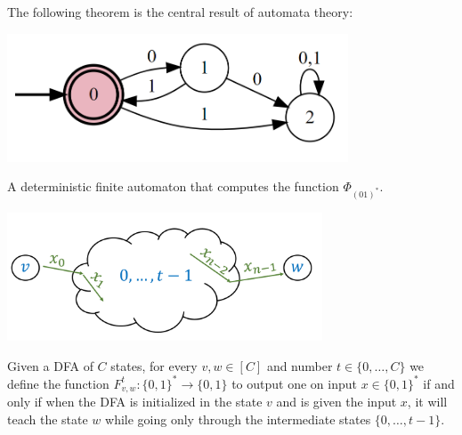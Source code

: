 The following theorem is the central result of automata theory:

\hypertarget{dfaregequivthm}{}



\begin{marginfigure}
\centering
\includegraphics[width=\linewidth, height=1.5in, keepaspectratio]{../figure/automaton.png}
\caption{A deterministic finite automaton that computes the function
\(\Phi_{(01)^*}\).}
\label{automatonregfig}
\end{marginfigure}


\begin{marginfigure}
\centering
\includegraphics[width=\linewidth, height=1.5in, keepaspectratio]{../figure/dfatoreg1.png}
\caption{Given a DFA of \(C\) states, for every \(v,w \in [C]\) and
number \(t\in \{0,\ldots,C\}\) we define the function
\(F^t_{v,w}:\{0,1\}^* \rightarrow \{0,1\}\) to output one on input
\(x\in \{0,1\}^*\) if and only if when the DFA is initialized in the
state \(v\) and is given the input \(x\), it will teach the state \(w\)
while going only through the intermediate states \(\{0,\ldots,t-1\}\).}
\label{dfatoregonefig}
\end{marginfigure}

